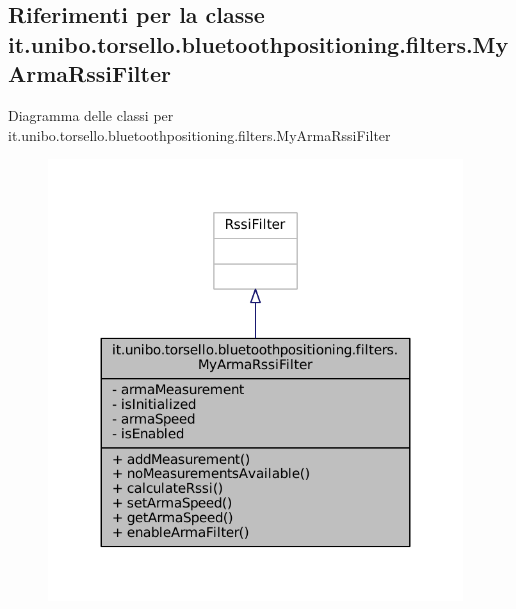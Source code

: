 \hypertarget{classit_1_1unibo_1_1torsello_1_1bluetoothpositioning_1_1filters_1_1MyArmaRssiFilter}{}\subsection{Riferimenti per la classe it.\+unibo.\+torsello.\+bluetoothpositioning.\+filters.\+My\+Arma\+Rssi\+Filter}
\label{classit_1_1unibo_1_1torsello_1_1bluetoothpositioning_1_1filters_1_1MyArmaRssiFilter}


Diagramma delle classi per it.\+unibo.\+torsello.\+bluetoothpositioning.\+filters.\+My\+Arma\+Rssi\+Filter
\nopagebreak
\begin{figure}[H]
\begin{center}
\leavevmode
\includegraphics[width=311pt]{classit_1_1unibo_1_1torsello_1_1bluetoothpositioning_1_1filters_1_1MyArmaRssiFilter__inherit__graph}
\end{center}
\end{figure}



